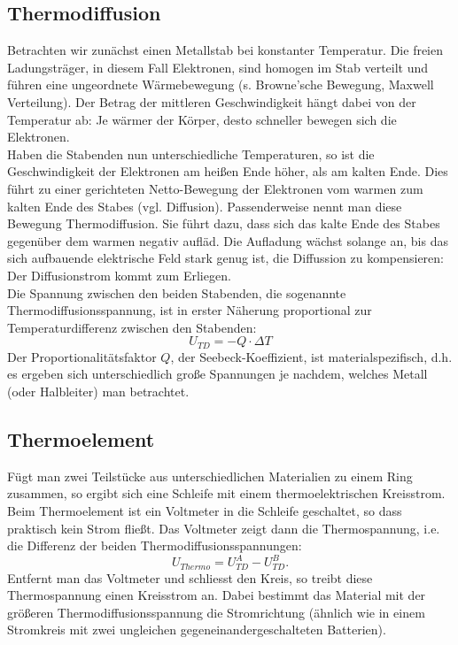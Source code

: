 \subsection{Thermodiffusion}

Betrachten wir zunächst einen Metallstab bei konstanter Temperatur. Die freien Ladungsträger, in diesem Fall Elektronen, sind homogen im Stab verteilt und führen eine ungeordnete Wärmebewegung (s. Browne'sche Bewegung, Maxwell Verteilung). Der Betrag der mittleren Geschwindigkeit hängt dabei von der Temperatur ab: Je wärmer der Körper, desto schneller bewegen sich die Elektronen.\\
Haben die Stabenden nun unterschiedliche Temperaturen, so ist die Geschwindigkeit der Elektronen am heißen Ende höher, als am kalten Ende. Dies führt zu einer gerichteten Netto-Bewegung der Elektronen vom warmen zum kalten Ende des Stabes (vgl. Diffusion). Passenderweise nennt man diese Bewegung Thermodiffusion. Sie führt dazu, dass sich das kalte Ende des Stabes gegenüber dem warmen negativ aufläd. Die Aufladung wächst solange an, bis das sich aufbauende elektrische Feld stark genug ist, die Diffussion zu kompensieren: Der Diffusionstrom kommt zum Erliegen.\\
Die Spannung zwischen den beiden Stabenden, die sogenannte Thermodiffusionsspannung, ist in erster Näherung proportional zur Temperaturdifferenz zwischen den Stabenden:
\begin{equation}
	U_{TD} = -Q\cdot \Delta T
\end{equation}
Der Proportionalitätsfaktor $Q$, der Seebeck-Koeffizient, ist materialspezifisch, d.h. es ergeben sich unterschiedlich große Spannungen je nachdem, welches Metall (oder Halbleiter) man betrachtet.

\subsection{Thermoelement}

Fügt man zwei Teilstücke aus unterschiedlichen Materialien zu einem Ring zusammen, so ergibt sich eine Schleife mit einem thermoelektrischen Kreisstrom. Beim Thermoelement ist ein Voltmeter in die Schleife geschaltet, so dass praktisch kein Strom fließt. Das Voltmeter zeigt dann die Thermospannung, i.e. die Differenz der beiden Thermodiffusionsspannungen:
\begin{equation}
	U_{Thermo} = U^A_{TD} - U^B_{TD}.
\end{equation}
Entfernt man das Voltmeter und schliesst den Kreis, so treibt diese Thermospannung einen Kreisstrom an. Dabei bestimmt das Material mit der größeren Thermodiffusionsspannung die Stromrichtung (ähnlich wie in einem Stromkreis mit zwei ungleichen gegeneinandergeschalteten Batterien).

